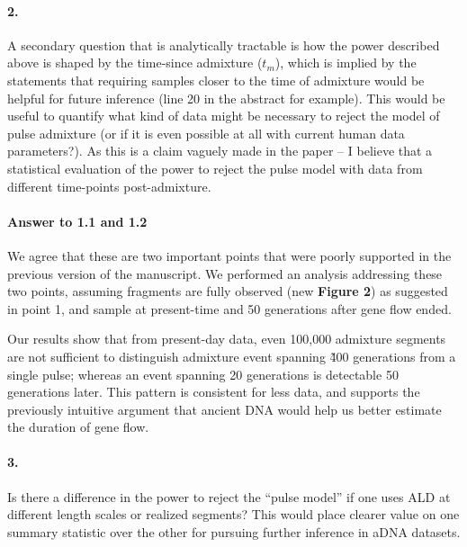\documentclass[11pt]{article}
\let\oldparagraph\paragraph
\renewcommand{\paragraph}[1]{\oldparagraph{#1}\mbox{}}
\begin{document}
\paragraph{2.}
A secondary question that is analytically tractable is how the power described above is shaped by the time-since admixture ($t_m$), which is implied by the statements that requiring samples closer to the time of admixture would be helpful for future inference (line 20 in the abstract for example). This would be useful to quantify what kind of data might be necessary to reject the model of pulse admixture (or if it is even possible at all with current human data parameters?). As this is a claim vaguely made in the paper – I believe that a statistical evaluation of the power to reject the pulse model with data from different time-points post-admixture. 

\paragraph{Answer to 1.1 and 1.2}
We agree that these are two important points that were poorly supported in the previous version of the manuscript. We performed an analysis addressing these two points, assuming fragments are fully observed (new \textbf{Figure 2}) as suggested in point 1, and sample at present-time and 50 generations after gene flow ended.

Our results show that from present-day data, even 100,000 admixture segments are not sufficient to distinguish admixture event spanning \~400 generations from a single pulse; whereas an event spanning 20 generations is detectable 50 generations later. This pattern is consistent for less data, and supports the previously intuitive argument that ancient DNA would help us better estimate the duration of gene flow.


\paragraph{3.}
Is there a difference in the power to reject the “pulse model” if one uses ALD at different length scales or realized segments? This would place clearer value on one summary statistic over the other for pursuing further inference in aDNA datasets. 
\end{document}
